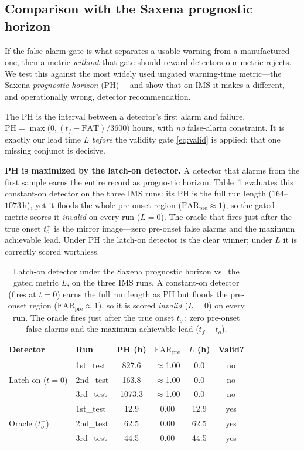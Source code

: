 \documentclass[journal]{IEEEtran}
\begin{document}
\subsection{Comparison with the Saxena prognostic horizon}
\label{sec:saxena}
If the false-alarm gate is what separates a usable warning from a manufactured one,
then a metric \emph{without} that gate should reward detectors our metric rejects.
We test this against the most widely used ungated warning-time metric---the Saxena
\emph{prognostic horizon} (PH) \cite{saxena2008,saxena2010}---and show that on IMS it
makes a different, and operationally wrong, detector recommendation.

The PH is the interval between a detector's first alarm and failure,
$\mathrm{PH}=\max\!\big(0,(t_f-\mathrm{FAT})/3600\big)$ hours, with \emph{no}
false-alarm constraint. It is exactly our lead time $L$ \emph{before} the validity
gate \eqref{eq:valid} is applied; that one missing conjunct is decisive.

\textbf{PH is maximized by the latch-on detector.} A detector that alarms from the
first sample earns the entire record as prognostic horizon.
Table~\ref{tab:latchon} evaluates this constant-on detector on the three IMS runs:
its PH is the full run length ($164$--$1073$\,h), yet it floods the whole pre-onset
region ($\mathrm{FAR}_{\mathrm{pre}}\!\approx\!1$), so the gated metric scores it
\emph{invalid} on every run ($L{=}0$). The oracle that fires just after the true
onset $t_o^{+}$ is the mirror image---zero pre-onset false alarms and the maximum
achievable lead. Under PH the latch-on detector is the clear winner; under $L$ it is
correctly scored worthless.

\begin{table}[t]
\caption{Latch-on detector under the Saxena prognostic horizon vs.\ the gated
metric $L$, on the three IMS runs. A constant-on detector (fires at $t{=}0$) earns
the full run length as PH but floods the pre-onset region
($\mathrm{FAR}_{\mathrm{pre}}\!\approx\!1$), so it is scored \emph{invalid}
($L{=}0$) on every run. The oracle fires just after the true onset $t_o^{+}$: zero
pre-onset false alarms and the maximum achievable lead ($t_f-t_o$).}
\label{tab:latchon}
\centering
\footnotesize
\begin{tabular}{@{}llcccc@{}}
\toprule
Detector & Run & PH (h) & $\mathrm{FAR}_{\mathrm{pre}}$ & $L$ (h) & Valid? \\
\midrule
\multirow{3}{*}{Latch-on ($t{=}0$)}
 & 1st\_test & \phantom{0}827.6 & $\approx$1.00 & 0.0 & no \\
 & 2nd\_test & \phantom{0}163.8 & $\approx$1.00 & 0.0 & no \\
 & 3rd\_test & 1073.3 & $\approx$1.00 & 0.0 & no \\
\midrule
\multirow{3}{*}{Oracle ($t_o^{+}$)}
 & 1st\_test & \phantom{0}12.9 & 0.00 & 12.9 & yes \\
 & 2nd\_test & \phantom{0}62.5 & 0.00 & 62.5 & yes \\
 & 3rd\_test & \phantom{0}44.5 & 0.00 & 44.5 & yes \\
\bottomrule
\end{tabular}
\end{table}
\end{document}
